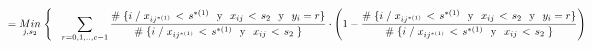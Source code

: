 \documentclass[
  11pt,
  a4paper,
]{article}
\begin{document}
\begin{gather*}
\hspace{-2.5 cm} =     \underset{j  ,  s_2}  {Min} \hspace{0.1cm} \Biggl\{     \hspace{0.3cm}  \sum_{r=0,1,..,c-1}^{}   \dfrac{\# \hspace{0.1 cm}\lbrace i \hspace{0.1 cm}/\hspace{0.1 cm}  x_{ij^{*(1)}} \hspace{0.05cm}   < \hspace{0.05cm} s^{*(1)} \hspace{0.25 cm}\text{y}\hspace{0.25 cm} x_{ij} \hspace{0.05cm}   < \hspace{0.05cm} s_2 \hspace{0.25 cm}\text{y}\hspace{0.25 cm} y_i = r \rbrace}{\# \hspace{0.1 cm}\lbrace i \hspace{0.1 cm} / \hspace{0.1 cm}  x_{ij^{*(1)}} \hspace{0.05cm}   < \hspace{0.05cm} s^{*(1)} \hspace{0.25 cm}\text{y}\hspace{0.25 cm} x_{ij} \hspace{0.05cm}   < \hspace{0.05cm} s_2  \hspace{0.1 cm} \rbrace } \cdot \left(   1 -  \dfrac{\# \hspace{0.1 cm}\lbrace i \hspace{0.1 cm}/\hspace{0.1 cm}  x_{ij^{*(1)}} \hspace{0.05cm}   < \hspace{0.05cm} s^{*(1)} \hspace{0.25 cm}\text{y}\hspace{0.25 cm} x_{ij} \hspace{0.05cm}   < \hspace{0.05cm} s_2 \hspace{0.25 cm}\text{y}\hspace{0.25 cm} y_i = r \rbrace}{\# \hspace{0.1 cm}\lbrace i \hspace{0.1 cm} / \hspace{0.1 cm}  x_{ij^{*(1)}} \hspace{0.05cm}   < \hspace{0.05cm} s^{*(1)} \hspace{0.25 cm}\text{y}\hspace{0.25 cm} x_{ij} \hspace{0.05cm}   < \hspace{0.05cm} s_2  \hspace{0.1 cm} \rbrace } \right) \\ \\

\end{gather*}
\end{document}
